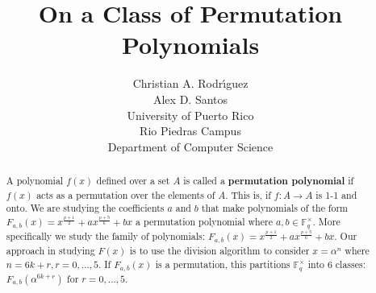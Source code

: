 \documentclass[12pt]{article}
\title{On a Class of Permutation Polynomials}
\author{Christian A. Rodr\'{\i}guez \\ Alex D. Santos \\ University of Puerto Rico \\ Rio Piedras Campus \\ Department of Computer Science}
\date{}
\begin{document}
\maketitle

\begin{abstract}

A polynomial $f(x)$ defined over a set $A$ is called a \textbf{permutation polynomial} if $f(x)$ acts as a permutation over the elements of $A$. This is, if $f: A \rightarrow A$ is 1-1 and onto. We are studying the coefficients $a$ and $b$ that make polynomials of the form $F_{a,b}(x)=x^{\frac{p+1}{2}} + ax^{\frac{p+5}{6}} + bx$ a permutation polynomial where $a,b \in \mathbb{F}_{q}^{\times}$. More specifically we study the family of polynomials: $F_{a,b}(x)=x^{\frac{p+1}{2}} + ax^{\frac{p+5}{6}} + bx$. Our approach in studying $F(x)$ is to use the division algorithm to consider $x=\alpha^{n}$ where $n=6k+r, r=0,...,5$. If $F_{a,b}(x)$ is a permutation, this partitions $\mathbb{F}_{q}^{\times}$ into 6 classes: $F_{a,b}(\alpha^{6k+r})$ for $r=0,...,5$.

\end{abstract}
\end{document}
